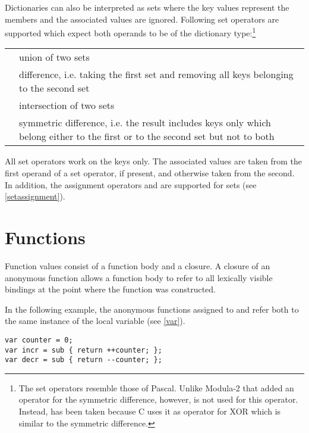 Dictionaries can also be interpreted as sets\label{sets}
where the key values represent the members and the associated values
are ignored.  Following set operators are supported which expect both
operands to be of the dictionary type:\footnote{The set operators
resemble those of Pascal. Unlike Modula-2 that added an
operator for the symmetric difference, however, \token{/} is
not used for this operator. Instead, \token{\caretSY} has been taken because
C uses it as operator for XOR which is similar to the symmetric
difference.}

\begin{tabular}{l p{4in}}
   \token{+} & union of two sets \\
   \token{-} & difference, i.e. taking the first set
      and removing all keys belonging to the second set \\
   \token{*} & intersection of two sets \\
   \token{\caretSY} & symmetric difference, i.e. the result
      includes keys only which belong either to the first or
      to the second set but not to both \\
\end{tabular}

\noindent
All set operators work on the keys only.
The associated values are taken from the first operand of a
set operator, if present, and otherwise taken from the second.
In addition, the assignment operators \token{+=} and \token{-=}
are supported for sets (see \ref{setassignment}).

\section{Functions}\label{function}

Function values consist of a function body and a closure.
A closure of an anonymous function allows a
function body to refer to all lexically visible bindings at the point
where the function was constructed.

In the following example, the anonymous functions assigned to
 and  refer both to the same instance
of the local variable  (see \ref{var}).

\begin{lstlisting}
var counter = 0;
var incr = sub { return ++counter; };
var decr = sub { return --counter; };
\end{lstlisting}

